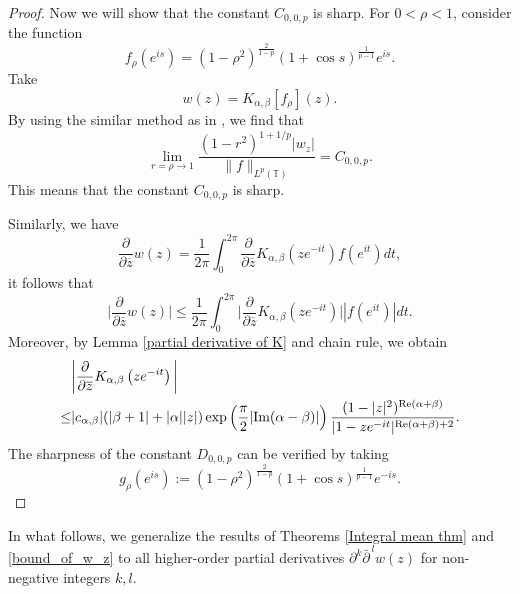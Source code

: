 \documentclass[11pt, reqno]{amsart}
\theoremstyle{definition}
\numberwithin{equation}{section}
\newcommand{\abs}[1]{\left\vert#1\right\vert}
\theoremstyle{remark}
\numberwithin{equation}{section}
\begin{document}
\begin{proof}
 		Now we will show that the constant $C_{0,0,p}$ is sharp. For $0<\rho<1$, consider the function 
		\begin{equation*}
			f_\rho\left(e^{is}\right)=\left(1-\rho^2\right)^{\frac{2}{1-p}}(1+\cos s)^{\frac{1}{p-1}}e^{is}. 
		\end{equation*} 
		Take $$w(z)=K_{\alpha,\beta}[f_\rho](z).$$
		By using the similar method as in \cite{optimal_inequalities_alpha_harmonic}, we find that $$\lim\limits_{r=\rho\rightarrow1}\frac{(1-r^2)^{1+1/p}|w_z|}{\|f\|_{L^p(\mathbb{T})}}=C_{0,0,p}.$$
		This means that the constant $C_{0,0,p}$ is sharp.
        
        Similarly, we have
		$$\frac{\partial}{\partial \overline{z}}w(z)=\frac{1}{2\pi} \int_0^{2\pi} \frac{\partial}{\partial \overline{z}}K_{\alpha,\beta}\left(z e^{-it}\right) f\left(e^{it}\right) dt,$$
		it follows that 
		\begin{equation*}
			\bigg|\frac{\partial}{\partial \overline{z}}w(z)\bigg|\leq \frac{1}{2\pi} \int_0^{2\pi}\bigg|\frac{\partial}{\partial \overline{z}}K_{\alpha,\beta}\left(z e^{-it}\right)\bigg|\abs{f\left(e^{it}\right)}dt.
		\end{equation*}
		Moreover, by Lemma \ref{partial derivative of K} and chain rule, we obtain
		\begin{align*}
        \begin{split}
			&\bigg|\frac{\partial}{\partial \overline{z}}K_{\alpha,\beta}\left(z e^{-it}\right)\bigg|\\ \leq &|c_{\alpha,\beta}|(|\beta +1 |+|\alpha| |z|)\exp\left(\frac{\pi}{2}|\text{\rm Im}(\alpha-\beta)|\right)\frac{(1-|z|^2)^{\text{Re}(\alpha+\beta)}}{|1-ze^{-it}|^{\text{Re}(\alpha+\beta)+2}}.
            \end{split}
		\end{align*}
		The sharpness of the constant $D_{0,0,p}$ can be verified by taking
		\[
		g_\rho\left(e^{is}\right):=\left(1-\rho^2\right)^{\frac{2}{1-p}} (1+\cos s)^{\frac{1}{p-1}} e^{-is}.
		\]
	\end{proof}

In what follows, we generalize the results of Theorems \ref{Integral mean thm} and \ref{bound_of_w_z} to all higher-order partial derivatives $\partial^{k} \bar{\partial}^{\,l} w(z)$ for non-negative integers $k,l$. %
	
\end{document}
